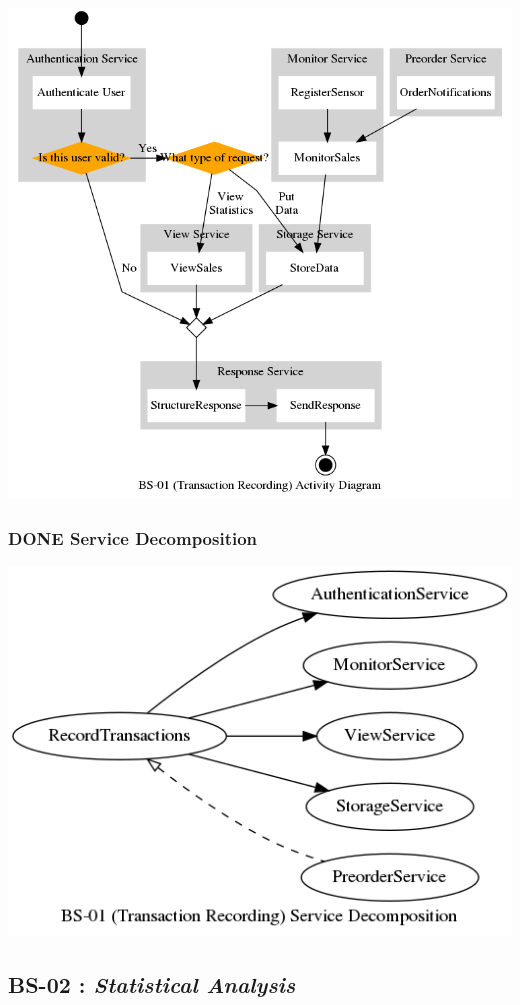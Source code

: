 \documentclass[11pt]{article}
\begin{document}
\begin{center}
\includegraphics[width=.9\linewidth]{res/bs_01_act.png}
\end{center}
\subsubsection{{\bfseries\sffamily DONE} Service Decomposition}
\label{sec:org6955972}
\begin{center}
\includegraphics[width=.9\linewidth]{res/bs_01_dcmp.png}
\end{center}
\newpage

\subsection{\label{org9e1dcbc}BS-02 : \emph{Statistical Analysis}}
\label{sec:org86d7450}
\end{document}
